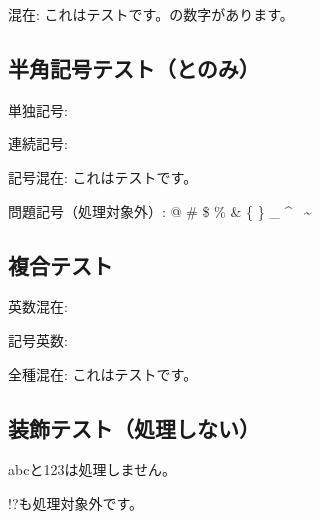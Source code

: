混在:
これはテストです。{\small{}}の数字{\small{}}があります。

\hypertarget{ux534aux89d2ux8a18ux53f7ux30c6ux30b9ux30c8ux3068ux306eux307f}{%
\subsection{\texorpdfstring{半角記号テスト（\tatechuyoko*{!}とのみ）}{半角記号テスト（とのみ）}}\label{ux534aux89d2ux8a18ux53f7ux30c6ux30b9ux30c8ux3068ux306eux307f}}

単独記号: \tatechuyoko*{!} 

連続記号: {\small\tatechuyoko*{!!}}
{\small{}}

記号混在: これは\tatechuyoko*{!}テストです。

問題記号（処理対象外）:
@ \# \$ \% \& \{ \} \_ \^{} ~\textasciitilde{} \textbar{}

\hypertarget{ux8907ux5408ux30c6ux30b9ux30c8}{%
\subsection{複合テスト}\label{ux8907ux5408ux30c6ux30b9ux30c8}}

英数混在: 
 

記号英数: \tatechuyoko*{!}

全種混在:
これは\tatechuyoko*{!}テストです。

\hypertarget{htmlux88c5ux98feux30c6ux30b9ux30c8ux51e6ux7406ux3057ux306aux3044}{%
\subsection{\texorpdfstring{装飾テスト（処理しない）}{装飾テスト（処理しない）}}\label{htmlux88c5ux98feux30c6ux30b9ux30c8ux51e6ux7406ux3057ux306aux3044}}

{abc}と{123}は処理しません。

{!?}も処理対象外です。
